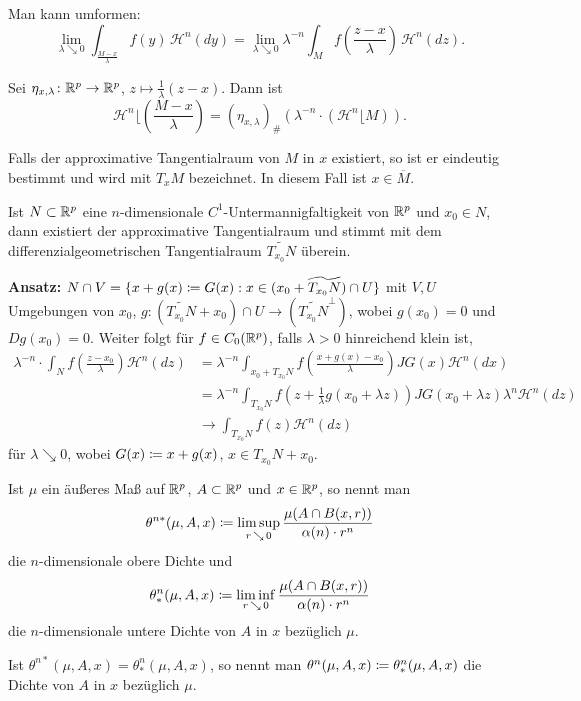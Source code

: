 \documentclass[a4paper,twoside,DIV15,BCOR12mm]{scrbook}
\newcommand{\HM}{\mathscr H}
\DeclareMathOperator{\downto}{\searrow}
\newcommand{\MR}{\lfloor}
\begin{document}
\begin{bemerkungen}
\item Man kann umformen:
\[
\lim_{\lambda \downto0} \int_{\frac{M-x}\lambda} f(y)\, \HM^n(dy) =  \lim_{\lambda\downto0} \lambda^{-n}\int_M f(\frac{z-x}\lambda)\,\HM^n(dz).
\]
\item Sei $\eta_{x,\lambda}\colon\mathbb{R}^p\to\mathbb{R}^p$, $z\mapsto \frac 1\lambda(z-x)$. Dann ist \[
\HM^n\MR \left( \frac{M-x}{\lambda} \right) = (\eta_{x,\lambda})_\# (\lambda^{-n} \cdot (\HM^n\MR M)).
\]
\item Falls der approximative Tangentialraum von $M$ in $x$ existiert, so ist er eindeutig bestimmt und wird mit $T_xM$ bezeichnet. In diesem Fall ist $x\in\overline M$.
\item Ist $N\subset \mathbb{R}^p$ eine $n$-dimensionale $C^1$-Untermannigfaltigkeit von $\mathbb{R}^p$ und $x_0 \in N$, dann existiert der approximative Tangentialraum und stimmt mit dem differenzialgeometrischen Tangentialraum $\widetilde {T_{x_0}N}$ überein.

\textbf{Ansatz:} $N\cap V = \{x + g(x) \da G(x) : x\in (x_0 + \widetilde{T_{x_0}N}) \cap U\}$ mit $V,U$ Umgebungen von $x_0$, $g:(\widetilde{T_{x_0}N} + x_0) \cap U \to (\widetilde{T_{x_0}N}^\bot)$, wobei $g(x_0)=0$ und \(Dg(x_0)=0\). Weiter folgt für \(f \in C_0(\mathbb{R}^p)\), falls \(\lambda>0\) hinreichend klein ist,
\begin{align*}
\lambda^{-n} \cdot \int_N f(\frac{z-x_0}{\lambda}) \HM^n(dz) &= \lambda^{-n} \int_{x_0+T_{x_0}N} f(\frac{x+g(x)-x_0}\lambda) JG(x) \HM^n(dx) \\
&= \lambda^{-n} \int_{T_{x_0}N} f(z+\frac1\lambda g(x_0+\lambda z)) JG(x_0+\lambda z) \lambda^n \HM^n(dz) \\
&\to \int_{T_{x_0}N} f(z) \HM^n(dz)
\end{align*}
für  $ \lambda \downto 0$, 
wobei \(G(x) \da x+g(x)\), \(x\in T_{x_0}N + x_0\).
\end{bemerkungen}

\begin{definition}
Ist \(\mu\) ein äußeres Maß auf \(\mathbb{R}^p\), \(A \subset \mathbb{R}^p\) und \(x \in \mathbb{R}^p\), so nennt man 
\[
\theta^{n*}(\mu,A,x) \da \limsup_{r\downto0} \frac{\mu(A\cap B(x,r))}{\alpha(n)\cdot r^n}
\]
die \(n\)-dimensionale obere Dichte und
\[
\theta^n_*(\mu,A,x) \da \liminf_{r\downto0} \frac{\mu(A\cap B(x,r))}{\alpha(n)\cdot r^n}
\]
die \(n\)-dimensionale untere Dichte von \(A\) in \(x\) bezüglich \(\mu\).
\par
Ist \(\theta^{n*}(\mu,A,x) = \theta^n_*(\mu,A,x)\), so nennt man \(\theta^n(\mu,A,x) \da \theta^n_*(\mu,A,x)\) die Dichte von \(A\) in \(x\) bezüglich \(\mu\).
\end{definition}
\end{document}

